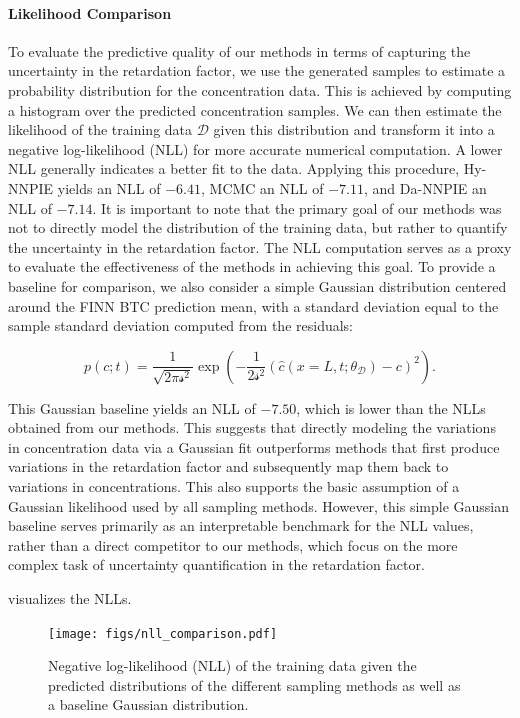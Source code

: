 \paragraph{Likelihood Comparison}
\label{sec:likelihood}
To evaluate the predictive quality of our methods in terms of capturing the uncertainty in the retardation factor, we use the generated samples to estimate a probability distribution for the concentration data. This is achieved by computing a histogram over the predicted concentration samples. We can then estimate the likelihood of the training data $\mathcal{D}$ given this distribution and transform it into a negative log-likelihood (NLL) for more accurate numerical computation. A lower NLL generally indicates a better fit to the data. Applying this procedure, Hy-NNPIE yields an NLL of $-6.41$, MCMC an NLL of $-7.11$, and Da-NNPIE an NLL of $-7.14$. It is important to note that the primary goal of our methods was not to directly model the distribution of the training data, but rather to quantify the uncertainty in the retardation factor. The NLL computation serves as a proxy to evaluate the effectiveness of the methods in achieving this goal. To provide a baseline for comparison, we also consider a simple Gaussian distribution centered around the FINN BTC prediction mean, with a standard deviation equal to the sample standard deviation computed from the residuals:

\begin{equation*}
    p(c; t) = \frac{1}{\sqrt{2 \pi \mathcal{s}^2}} \exp(-\frac{1}{2 \mathcal{s}^2} (\hat{c}(x=L, t;\theta_{\mathcal{D}}) - c)^2) .
\end{equation*}

This Gaussian baseline yields an NLL of $-7.50$, which is lower than the NLLs obtained from our methods. This suggests that directly modeling the variations in concentration data via a Gaussian fit outperforms methods that first produce variations in the retardation factor and subsequently map them back to variations in concentrations. This also supports the basic assumption of a Gaussian likelihood used by all sampling methods. However, this simple Gaussian baseline serves primarily as an interpretable benchmark for the NLL values, rather than a direct competitor to our methods, which focus on the more complex task of uncertainty quantification in the retardation factor.


 visualizes the NLLs.

\begin{figure}[h]
    \centering
    \texttt{[image: figs/nll\_comparison.pdf]}
    \caption{Negative log-likelihood (NLL) of the training data given the predicted distributions of the different sampling methods as well as a baseline Gaussian distribution.}
    \label{fig:nll_comparison}
\end{figure}


